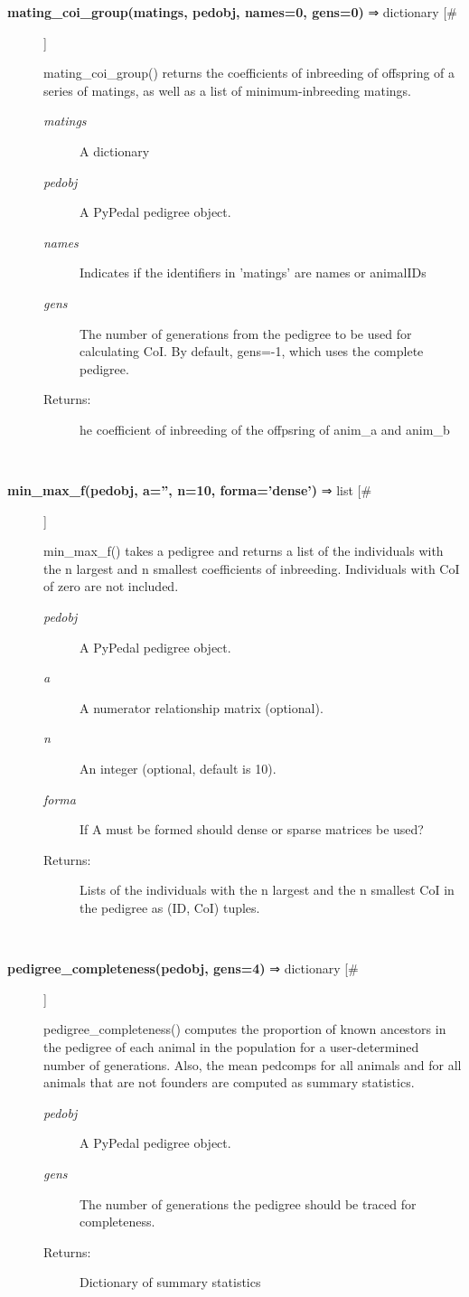 \begin{description}
\item[\textbf{mating\_coi\_group(matings, pedobj, names=0, gens=0)} ⇒ dictionary [\#]
]
\par mating\_coi\_group() returns the coefficients of inbreeding of offspring
of a series of matings, as well as a list of minimum-inbreeding matings.
\begin{description}
\item[\textit{matings}
]
A dictionary
\item[\textit{pedobj}
]
A PyPedal pedigree object.
\item[\textit{names}
]
Indicates if the identifiers in 'matings' are names or animalIDs
\item[\textit{gens}
]
The number of generations from the pedigree to be used for calculating CoI.  By default, gens=-1, which uses the complete pedigree.
\item[Returns:
]
he coefficient of inbreeding of the offpsring of anim\_a and anim\_b
\end{description}\\

\item[\textbf{min\_max\_f(pedobj, a='', n=10, forma='dense')} ⇒ list [\#]
]
\par min\_max\_f() takes a pedigree and returns a list of the individuals with the n
largest and n smallest coefficients of inbreeding.  Individuals with CoI of
zero are not included.
\begin{description}
\item[\textit{pedobj}
]
A PyPedal pedigree object.
\item[\textit{a}
]
A numerator relationship matrix (optional).
\item[\textit{n}
]
An integer (optional, default is 10).
\item[\textit{forma}
]
If A must be formed should dense or sparse matrices be used?
\item[Returns:
]
Lists of the individuals with the n largest and the  n smallest CoI in the pedigree as (ID, CoI) tuples.
\end{description}\\

\item[\textbf{pedigree\_completeness(pedobj, gens=4)} ⇒ dictionary [\#]
]
\par pedigree\_completeness() computes the proportion of known ancestors in the pedigree of
each animal in the population for a user-determined number of generations.    Also,
the mean pedcomps for all animals and for all animals that are not founders are
computed as summary statistics.
\begin{description}
\item[\textit{pedobj}
]
A PyPedal pedigree object.
\item[\textit{gens}
]
The number of generations the pedigree should be traced for completeness.
\item[Returns:
]
Dictionary of summary statistics
\end{description}\\


\end{description}
